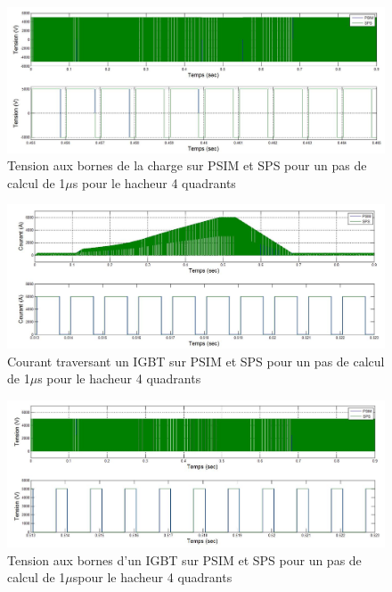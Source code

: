 \documentclass[11pt,letterpaper,final]{report}
\begin{document}
\begin{figure}[htb]
\centering
\includegraphics[scale=0.5]{Fig/Hacheur4Quadrants/HacheurTensionCharge1u.jpg}
\caption{Tension aux bornes de la charge sur PSIM et SPS pour un pas de calcul de 1$\mu$s pour le hacheur 4 quadrants}
\label{hc_ten_ch_1}
\end{figure}


\begin{figure}[htb]
\centering
\includegraphics[scale=0.5]{Fig/Hacheur4Quadrants/HacheurCourantIGBT1u.jpg}
\caption{Courant traversant un IGBT sur PSIM et SPS pour un pas de calcul de 1$\mu$s pour le hacheur 4 quadrants}
\label{hc_IG_cou_1}
\end{figure}

\begin{figure}[htb]
\centering
\includegraphics[scale=0.5]{Fig/Hacheur4Quadrants/HacheurTensionIGBT1u.jpg}
\caption{Tension aux bornes d'un IGBT sur PSIM et SPS pour un pas de calcul de 1$\mu$spour le hacheur 4 quadrants}
\label{hc_IG_ten_1}
\end{figure}
\end{document}
